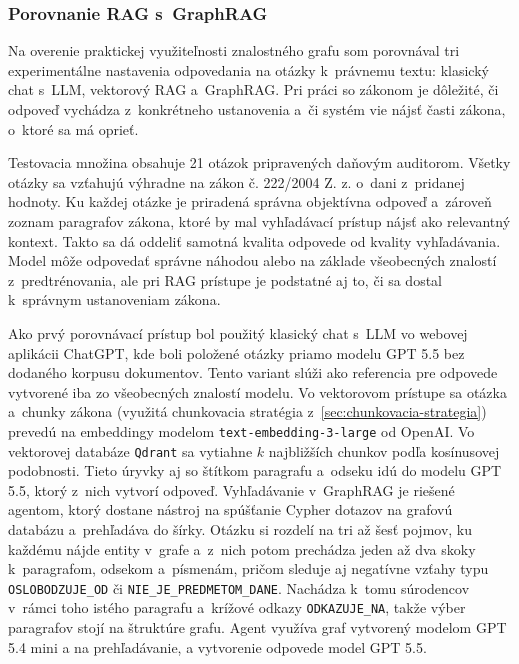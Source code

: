 \subsubsection{Porovnanie RAG s~GraphRAG}

Na overenie praktickej využiteľnosti znalostného grafu som porovnával tri experimentálne nastavenia odpovedania na otázky k~právnemu textu: klasický chat s~LLM, vektorový RAG a~GraphRAG. Pri práci so zákonom je dôležité, či odpoveď vychádza z~konkrétneho ustanovenia a~či systém vie nájsť časti zákona, o~ktoré sa má oprieť.

Testovacia množina obsahuje 21 otázok pripravených daňovým auditorom. Všetky otázky sa vzťahujú výhradne na zákon č. 222/2004 Z. z. o~dani z~pridanej hodnoty. Ku každej otázke je priradená správna objektívna odpoveď a~zároveň zoznam paragrafov zákona, ktoré by mal vyhľadávací prístup nájsť ako relevantný kontext. Takto sa dá oddeliť samotná kvalita odpovede od kvality vyhľadávania. Model môže odpovedať správne náhodou alebo na základe všeobecných znalostí z~predtrénovania, ale pri RAG prístupe je podstatné aj to, či sa dostal k~správnym ustanoveniam zákona.


Ako prvý porovnávací prístup bol použitý klasický chat s~LLM vo webovej aplikácii ChatGPT, kde boli položené otázky priamo modelu GPT 5.5 bez dodaného korpusu dokumentov. Tento variant slúži ako referencia pre odpovede vytvorené iba zo všeobecných znalostí modelu. Vo vektorovom prístupe sa otázka a~chunky zákona (využitá chunkovacia stratégia z~\ref{sec:chunkovacia-strategia}) prevedú na embeddingy modelom \texttt{text-embedding-3-large} od OpenAI. Vo vektorovej databáze \texttt{Qdrant} sa vytiahne $k$ najbližších chunkov podľa kosínusovej podobnosti. Tieto úryvky aj so štítkom paragrafu a~odseku idú do modelu GPT 5.5, ktorý z~nich vytvorí odpoveď. Vyhľadávanie v~GraphRAG je riešené agentom, ktorý dostane nástroj na spúšťanie Cypher dotazov na grafovú databázu a~prehľadáva do šírky. Otázku si rozdelí na tri až šesť pojmov, ku každému nájde entity v~grafe a~z~nich potom prechádza jeden až dva skoky k~paragrafom, odsekom a~písmenám, pričom sleduje aj negatívne vzťahy typu \texttt{OSLOBODZUJE\_OD} či \texttt{NIE\_JE\_PREDMETOM\_DANE}. Nachádza k~tomu súrodencov v~rámci toho istého paragrafu a~krížové odkazy \texttt{ODKAZUJE\_NA}, takže výber paragrafov stojí na štruktúre grafu. Agent využíva graf vytvorený modelom GPT 5.4 mini a na prehľadávanie, a vytvorenie odpovede model GPT 5.5.


